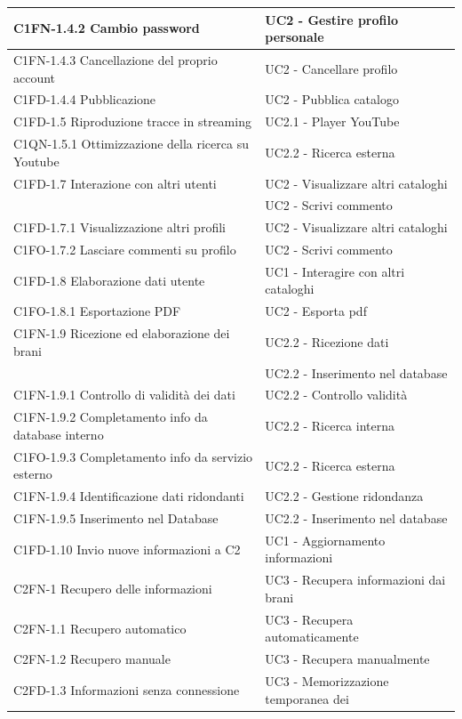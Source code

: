 \begin{footnotesize}
\begin{longtable}[!h]{|l|l|}
\hline
C1FN-1.4.2 Cambio password & UC2 - Gestire profilo personale \\ \hline
C1FN-1.4.3 Cancellazione del proprio account & UC2 - Cancellare profilo \\
\hline
C1FD-1.4.4 Pubblicazione & UC2 - Pubblica catalogo \\ \hline
C1FD-1.5 Riproduzione tracce in streaming & UC2.1 - Player YouTube \\ \hline
C1QN-1.5.1 Ottimizzazione della ricerca su Youtube & UC2.2 - Ricerca esterna \\
\hline
C1FD-1.7 Interazione con altri utenti & UC2 - Visualizzare altri cataloghi \\
 & UC2 - Scrivi commento \\ \hline
C1FD-1.7.1 Visualizzazione altri profili & UC2 - Visualizzare altri cataloghi \\
\hline
C1FO-1.7.2 Lasciare commenti su profilo & UC2 - Scrivi commento \\ \hline
C1FD-1.8 Elaborazione dati utente & UC1 - Interagire con altri cataloghi \\
\hline
C1FO-1.8.1 Esportazione PDF & UC2 - Esporta pdf \\ \hline
C1FN-1.9 Ricezione ed elaborazione dei brani & UC2.2 - Ricezione dati \\
 & UC2.2 - Inserimento nel database \\ \hline
C1FN-1.9.1 Controllo di validit\`a dei dati & UC2.2 - Controllo validit\`a \\
\hline C1FN-1.9.2 Completamento info da database interno & UC2.2 - Ricerca
interna \\ \hline
C1FO-1.9.3 Completamento info da servizio esterno & UC2.2 - Ricerca esterna \\
\hline
C1FN-1.9.4 Identificazione dati ridondanti & UC2.2 - Gestione ridondanza \\
\hline
C1FN-1.9.5 Inserimento nel Database & UC2.2 - Inserimento nel database \\ \hline
C1FD-1.10 Invio nuove informazioni a C2 & UC1 - Aggiornamento informazioni \\
\hline
C2FN-1 Recupero delle informazioni & UC3 - Recupera informazioni dai brani \\
\hline
C2FN-1.1 Recupero automatico & UC3 - Recupera automaticamente \\ \hline
C2FN-1.2 Recupero manuale & UC3 - Recupera manualmente \\ \hline
C2FD-1.3 Informazioni senza connessione & UC3 - Memorizzazione temporanea dei

\end{longtable}
\end{footnotesize}
